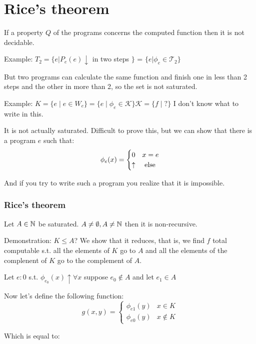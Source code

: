 \chapter {Rice's theorem}

If a property $Q$ of the programs concerns the computed function then
it is not decidable.

Example: $ T_2 = \{ e | P_e(e)\downarrow $ in two steps $ \} $ = $
\{e|\phi_e \in \mathcal{T}_2 \} $

But two programs can calculate the same function and finish one in
less than 2 steps and the other in more than 2, so the set is not
saturated.

Example: $ K = \{e \mid e\in W_e \} = \{e \mid \phi_e\in \mathcal{K}
\} \mathcal{K} = \{f \mid ? \}$ I don't know what to write in this.

It is not actually saturated. Difficult to prove this, but we can show
that there is a program $e$ such that:
\begin{equation*} \phi_e(x) = \begin{cases} 0 & x = e \\ \uparrow & $
else $
  \end{cases}
\end{equation*}

And if you try to write such a program you realize that it is
impossible.

\subsection {Rice's theorem} Let $ A \in \mathbb{N} $ be saturated. $ A \not=
\emptyset, A \not= \mathbb{N} $ then it is non-recursive.

Demonstration: $ K \leq A $? We show that it reduces, that is, we find
$f$ total computable s.t. all the elements of $K$ go to $A$ and all
the elements of the complenent of $K$ go to the complement of $A$.

Let $ e:0 $ s.t. $ \phi_{e_0}(x)\uparrow\forall x $ suppose $
e_0\not\in A $ and let $ e_1\in A $

Now let's define the following function:
\begin{equation*} g(x,y) = \begin{cases} \phi_{e1}(y) & x \in K \\
\phi_{e0}(y) & x \not\in K
  \end{cases}
\end{equation*}

Which is equal to:

